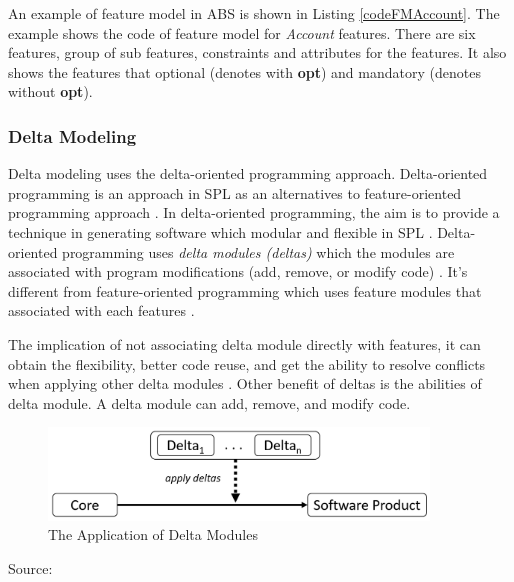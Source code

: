 An example of feature model in ABS is shown in Listing \ref{codeFMAccount}. The example shows the code of feature model for {\it Account} features. There are six features, group of sub features, constraints and attributes for the features. It also shows the features that optional (denotes with {\bf opt}) and mandatory (denotes without {\bf opt}).



\subsubsection{Delta Modeling}\label{DeltaModeling}
Delta modeling uses the delta-oriented programming approach. Delta-oriented programming is an approach in SPL as an alternatives to feature-oriented programming approach \citep{paper.clarke.variability}. In delta-oriented programming, the aim is to provide a technique in generating software which modular and flexible in SPL \citep{paper.clarke.variability,paper.johnsen2014.deploymentVariabilityinDeltaOriented,paper.schulze2013.refactoringDeltaOrientedSPL}. Delta-oriented programming uses \textit{delta modules (deltas)} which the modules are associated with program modifications (add, remove, or modify code) \citep{paper.clarke.variability}. It's different from feature-oriented programming  which uses feature modules \citep{paper.kastnerApel.FeatureOrientedSoftwareDevelopment} that associated with each features \citep{paper.clarke.variability,paper.schulze2013.refactoringDeltaOrientedSPL}.

The implication of not associating delta module directly with features, it can obtain the flexibility, better code reuse, and get the ability to resolve conflicts when applying other delta modules \citep{paper.clarke.variability}. Other benefit of deltas is the abilities of delta module. A delta module can add, remove, and modify code. 

\begin{figure}
	\centering
	\includegraphics[width=0.9\textwidth]
	{pics/applicationOfDelta2.png}
	\caption{The Application of Delta Modules}
	\label{fig:applicationOfDelta}
\end{figure}
\vspace{-1cm}
\begin{center}
	{\small Source: \citep{paper.hanle.ABStutorial}}
\end{center}

